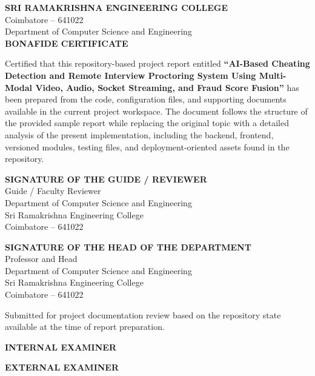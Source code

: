 \documentclass[12pt,a4paper]{extreport}
\begin{document}
\begin{titlepage}
\begin{center}
\vspace*{0.7cm}
{\bfseries\fontsize{18}{20}\selectfont SRI RAMAKRISHNA ENGINEERING COLLEGE}\\[0.25cm]
{\fontsize{12}{14}\selectfont Coimbatore -- 641022}\\[0.15cm]
{\fontsize{12}{14}\selectfont Department of Computer Science and Engineering}\\[1.3cm]

{\bfseries\fontsize{16}{18}\selectfont BONAFIDE CERTIFICATE}\\[1.0cm]
\end{center}

\noindent Certified that this repository-based project report entitled \textbf{``AI-Based Cheating Detection and Remote Interview Proctoring System Using Multi-Modal Video, Audio, Socket Streaming, and Fraud Score Fusion''} has been prepared from the code, configuration files, and supporting documents available in the current project workspace. The document follows the structure of the provided sample report while replacing the original topic with a detailed analysis of the present implementation, including the backend, frontend, versioned modules, testing files, and deployment-oriented assets found in the repository.

\vspace{2.8cm}

\noindent
\begin{minipage}[t]{0.45\textwidth}
\textbf{SIGNATURE OF THE GUIDE / REVIEWER}\\[0.35cm]
Guide / Faculty Reviewer\\
Department of Computer Science and Engineering\\
Sri Ramakrishna Engineering College\\
Coimbatore -- 641022
\end{minipage}
\hfill
\begin{minipage}[t]{0.45\textwidth}
\textbf{SIGNATURE OF THE HEAD OF THE DEPARTMENT}\\[0.35cm]
Professor and Head\\
Department of Computer Science and Engineering\\
Sri Ramakrishna Engineering College\\
Coimbatore -- 641022
\end{minipage}

\vfill
\noindent Submitted for project documentation review based on the repository state available at the time of report preparation.

\vspace{2cm}

\noindent
\begin{minipage}[t]{0.45\textwidth}
\textbf{INTERNAL EXAMINER}
\end{minipage}
\hfill
\begin{minipage}[t]{0.45\textwidth}
\textbf{EXTERNAL EXAMINER}
\end{minipage}
\end{titlepage}
\end{document}
